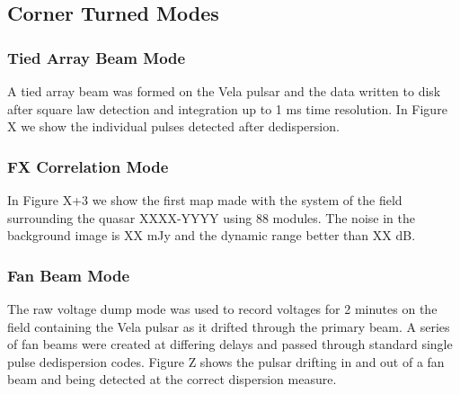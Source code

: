 \subsection{Corner Turned Modes}
\subsubsection{Tied Array Beam Mode}

A tied array beam was formed on the Vela pulsar and the data written to disk after square law detection and integration up to 1 ms time resolution. In Figure X we show the individual pulses detected after dedispersion. 

\subsubsection{FX Correlation Mode}

In Figure X+3 we show the first map made with the system of the field surrounding the quasar XXXX-YYYY using 88 modules. The noise in the background image is XX mJy and the dynamic range better than XX dB.

\subsubsection{Fan Beam Mode}

The raw voltage dump mode was used to record voltages for 2 minutes on the field containing the Vela pulsar as it drifted through the primary beam. A series of fan beams were created at differing delays and passed through standard single pulse dedispersion codes. Figure Z shows the pulsar drifting in and out of a fan beam and being detected at the correct dispersion measure.

